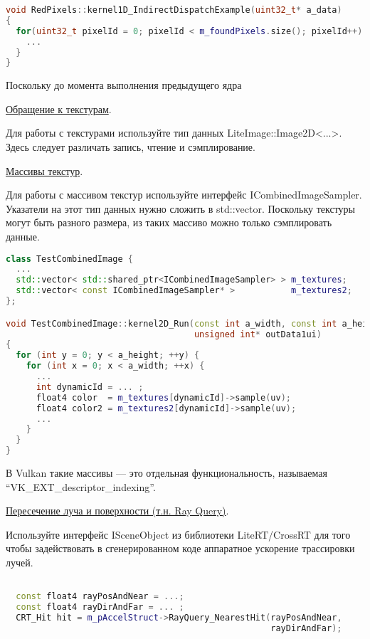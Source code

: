 \documentclass[11pt,fleqn,english,russian]{report} %
\begin{document}
\begin{lstlisting}[language=C++, 
	               caption=непрямой вызов ядра, 
	               label=lst:indirect_dispatch]	
void RedPixels::kernel1D_IndirectDispatchExample(uint32_t* a_data)
{
  for(uint32_t pixelId = 0; pixelId < m_foundPixels.size(); pixelId++) {
  	...
  }
}
\end{lstlisting}

Поскольку до момента выполнения предыдущего ядра

\noindent\underline{Обращение к текстурам}.

Для работы с текстурами используйте тип данных LiteImage::Image2D<...>. Здесь следует различать запись, чтение и сэмплирование.

\noindent\underline{Массивы текстур}.

Для работы с массивом текстур используйте интерфейс ICombinedImageSampler.
Указатели на этот тип данных нужно сложить в std::vector. Поскольку текстуры могут быть разного размера, из таких массиво можно только сэмплировать данные.

\begin{lstlisting}[language=C++, 
	caption=сэмплирование из массива текстур, 
	label=lst:texarrays]	
class TestCombinedImage {
  ...  
  std::vector< std::shared_ptr<ICombinedImageSampler> > m_textures;
  std::vector< const ICombinedImageSampler* >           m_textures2;
};

void TestCombinedImage::kernel2D_Run(const int a_width, const int a_height, 
                                     unsigned int* outData1ui)
{
  for (int y = 0; y < a_height; ++y) {
    for (int x = 0; x < a_width; ++x) {  
      ...
      int dynamicId = ... ;			
      float4 color  = m_textures[dynamicId]->sample(uv); 
      float4 color2 = m_textures2[dynamicId]->sample(uv);     
      ...
    }
  }
}
\end{lstlisting}

В Vulkan такие массивы --- это отдельная функциональность, называемая \newline ``VK\_EXT\_descriptor\_indexing''. 

\noindent\underline{Пересечение луча и поверхности (т.н. Ray Query)}.

Используйте интерфейс ISceneObject из библиотеки LiteRT/CrossRT \cite{litert} для того чтобы задействовать в сгенерированном коде аппаратное ускорение трассировки лучей.

\begin{lstlisting}[language=C++, 
	caption=поиск пересечения луча и поверхности, 
	label=lst:ray_query_hit]

  const float4 rayPosAndNear = ...;
  const float4 rayDirAndFar = ... ;		
  CRT_Hit hit = m_pAccelStruct->RayQuery_NearestHit(rayPosAndNear, 
                                                    rayDirAndFar);

\end{lstlisting}
\end{document}
